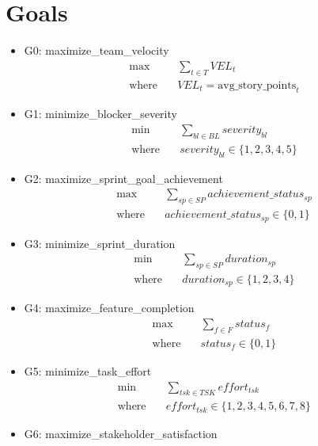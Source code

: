 \documentclass{article}
\begin{document}
\section{Goals}
\begin{itemize}
    \item G0: maximize\_team\_velocity
        \begin{align*}
            \max \quad &\sum_{t \in T} VEL_{t} \\
            \text{where} \quad &VEL_{t} = \text{avg\_story\_points}_{t}
        \end{align*}
    \item G1: minimize\_blocker\_severity
        \begin{align*}
            \min \quad &\sum_{bl \in BL} severity_{bl} \\
            \text{where} \quad &severity_{bl} \in \{1, 2, 3, 4, 5\}
        \end{align*}
    \item G2: maximize\_sprint\_goal\_achievement
        \begin{align*}
            \max \quad &\sum_{sp \in SP} achievement\_status_{sp} \\
            \text{where} \quad &achievement\_status_{sp} \in \{0, 1\}
        \end{align*}
    \item G3: minimize\_sprint\_duration
        \begin{align*}
            \min \quad &\sum_{sp \in SP} duration_{sp} \\
            \text{where} \quad &duration_{sp} \in \{1, 2, 3, 4\}
        \end{align*}
    \item G4: maximize\_feature\_completion
        \begin{align*}
            \max \quad &\sum_{f \in F} status_{f} \\
            \text{where} \quad &status_{f} \in \{0, 1\}
        \end{align*}
    \item G5: minimize\_task\_effort
        \begin{align*}
            \min \quad &\sum_{tsk \in TSK} effort_{tsk} \\
            \text{where} \quad &effort_{tsk} \in \{1, 2, 3, 4, 5, 6, 7, 8\}
        \end{align*}
    \item G6: maximize\_stakeholder\_satisfaction
        \begin{align*}

\end{align*}
\end{itemize}
\end{document}

